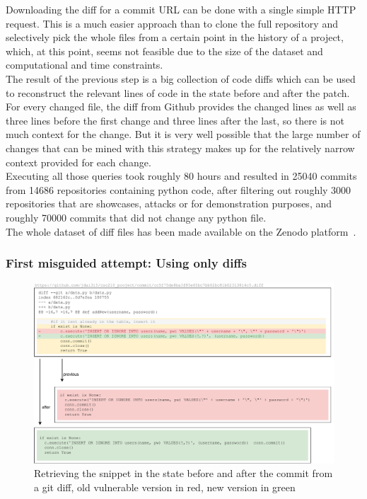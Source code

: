 \documentclass[
a4paper,
pagesize,
pdftex,
12pt,
ngerman,
fleqn,
final,
]{scrartcl}
\begin{document}
	Downloading the diff for a commit URL can be done with a single simple HTTP request. This is a much easier approach than to clone the full repository and selectively pick the whole files from a certain point in the history of a project, which, at this point, seems not feasible due to the size of the dataset and computational and time constraints. \\
	The result of the previous step is a big collection of code diffs which can be used to reconstruct the relevant lines of code in the state before and after the patch. For every changed file, the diff from Github provides the changed lines as well as three lines before the first change and three lines after the last, so there is not much context for the change. 
	But it is very well possible that the large number of changes that can be mined with this strategy makes up for the relatively narrow context provided for each change.\\
	Executing all those queries took roughly 80 hours and resulted in 25040 commits from 14686 repositories containing python code, after filtering out roughly 3000 repositories that are showcases, attacks or for demonstration purposes, and roughly 70000 commits that did not change any python file.\\
	The whole dataset of diff files has been made available on the Zenodo platform~\cite{Wartschinski.1.12.2019b}.	
	
	\subsubsection{First misguided attempt: Using only diffs}
	
	\begin{figure}[ht]
		\centering
		\includegraphics[width=\linewidth]{img/GitCommitPreviousAfter}
		\caption{Retrieving the snippet in the state before and after the commit from a git diff, old vulnerable version in red, new version in green}
		\label{fig:gitdiff}
	\end{figure}
	
\end{document}
